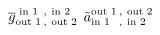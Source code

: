 \documentclass[11pt]{standalone}
\begin{document}
$
  \ol{g}{}^{\text{\makebox[20pt][l]{ in 1}},\ \text{\makebox[20pt][l]{in 2} }}_{\text{\makebox[20pt][l]{out 1}},\ \text{\makebox[20pt][l]{out 2}}}
  \tl{a}^{\text{\makebox[20pt][l]{out 1}},\ \text{\makebox[20pt][l]{out 2}}}_{\text{\makebox[20pt][l]{in 1}},\ \text{\makebox[20pt][l]{in 2} }}
$
\end{document}
